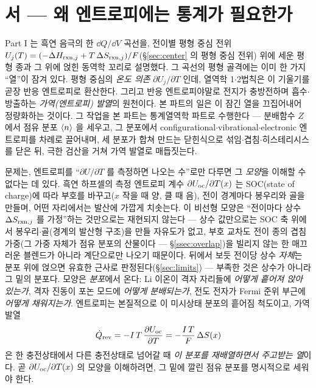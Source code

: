 \section*{서 --- 왜 엔트로피에는 통계가 필요한가}

Part I 는 흑연 음극의 한 $\dd Q/\dd V$ 곡선을, 전이별 평형 중심 전위
$U_j(T)=(-\Delta H_{\mathrm{rxn},j}+T\,\Delta S_{\mathrm{rxn},j})/F$(\S\ref{sec:center} 의 평형 중심 전위) 위에 세운 평형 종과 그 위에
얹힌 동역학 꼬리로 설명했다. 그 곡선의 평형 골격에는 이미 한 가지 ``열''이 잠겨 있다. 평형 중심의
\emph{온도 의존} $\partial U_j/\partial T$ 인데, 열역학 1$\cdot$2법칙은 이 기울기를 곧장 반응 엔트로피로 환산한다.
그리고 반응 엔트로피야말로 전지가 충방전하며 흡수$\cdot$방출하는 \emph{가역(엔트로피) 발열}의 원천이다.
본 파트의 일은 이 잠긴 열을 끄집어내어 정량화하는 것이다. 그 작업을 본 파트는 통계열역학 파트로 수행한다 ---
분배함수 $Z$ 에서 점유 분포 $\langle n\rangle$ 을 세우고, 그 분포에서 configurational$\cdot$vibrational$\cdot$electronic
엔트로피를 차례로 끌어내며, 세 분포가 합쳐 만드는 닫힌식으로 섞임$\cdot$겹침$\cdot$히스테리시스를 닫은 뒤,
극한 검산을 거쳐 가역 발열로 매듭짓는다.

문제는, 엔트로피를 ``$\partial U/\partial T$ 를 측정하면 나오는 수''로만 다루면 그 \emph{모양}을 이해할 수
없다는 데 있다. 흑연 하프셀의 측정 엔트로피 계수 $\partial U_{\mathrm{oc}}/\partial T(x)$ 는 SOC(state of charge)에 따라
부호를 바꾸고($x$ 작을 때 양, 클 때 음), 전이 경계마다 봉우리와 골을 만들며, 어떤 자리에서는 발산에 가깝게
치솟는다. 이 비선형 모양은 ``전이마다 상수 $\Delta S_{\mathrm{rxn},j}$ 를 가정''하는 것만으로는 재현되지
않는다 --- 상수 값만으로는 SOC 축 위에서 봉우리$\cdot$골(경계의 발산형 구조)을 만들 자유도가 없고,
부호 교차도 전이 종의 겹침 가중(그 가중 자체가 점유 분포의 산물이다 --- \S\ref{ssec:overlap})을 빌리지
않는 한 매끄러운 블렌드가 아니라 계단으로만 나오기 때문이다. 뒤에서 보듯 전이당 상수 \emph{자체}는 분포
위에 얹으면 유효한 근사로 판정된다(\S\ref{sec:limits}) --- 부족한 것은 상수가 아니라 그 밑의 분포다.
모양은 \emph{분포}에서 온다: Li 이온이 격자 자리들에 \emph{어떻게 흩어져 앉아 있는가}, 격자 진동이 포논
모드에 \emph{어떻게 분배되는가}, 전도 전자가 Fermi 준위 부근에 \emph{어떻게 채워지는가}. 엔트로피는 본질적으로
이 미시상태 분포의 흩어짐 척도이고, 가역 발열
\[
\dot Q_{\mathrm{rev}}=-I\,T\,\frac{\partial U_{\mathrm{oc}}}{\partial T}=-\frac{I\,T}{F}\,\Delta S(x)
\]
은 한 충전상태에서 다른 충전상태로 넘어갈 때 \emph{이 분포를 재배열하면서 주고받는 열}이다. 곧
$\partial U_{\mathrm{oc}}/\partial T(x)$ 의 모양을 이해하려면, 그 밑에 깔린 점유 분포를 명시적으로 세워야 한다.

